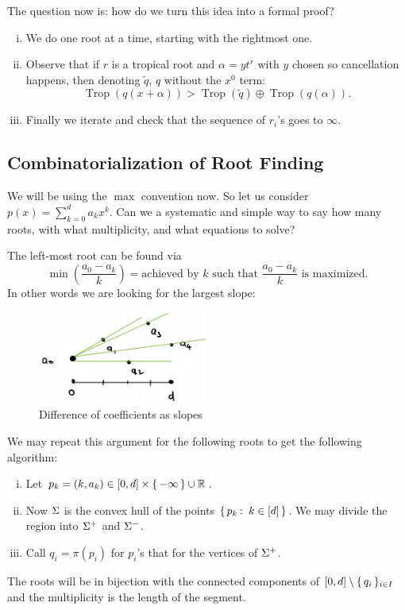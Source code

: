 \documentclass[12pt]{memoir}
\DeclareMathOperator{\Trop}{Trop}
\theoremstyle{definition}
\def\al{\alpha}
\begin{document}
The question now is: how do we turn this idea into a formal proof?
\begin{enumerate}[i.]
    \item We do one root at a time, starting with the rightmost one.
    \item Observe that if $r$ is a tropical root and $\al=yt^r$ with $y$ chosen so cancellation happens, then denoting $\tilde{q}$, $q$ without the $x^0$ term:
    $$\Trop(q(x+\al))>\Trop(\tilde{q})\oplus\Trop(q(\al)).$$
    \item Finally we iterate and check that the sequence of $r_i$'s goes to $\infty$.
\end{enumerate}

\subsection{Combinatorialization of Root Finding}

We will be using the $\max$ convention now. So let us consider $p(x)=\sum_{k=0}^da_kx^k$. Can we a systematic and simple way to say how many roots, with what multiplicity, and what equations to solve?\par 
The left-most root can be found via
$$\min\left(\frac{a_0-a_k}{k}\right)=\text{achieved by }k\text{ such that }\frac{a_0-a_k}{k}\text{ is maximized}.$$
In other words we are looking for the largest slope:
\begin{figure}[h!]
    \centering
    \includegraphics[width=0.5\textwidth]{figs/fig6-1BiggestSlope.png}
    \caption{Difference of coefficients as slopes}
    \label{fig:6.1-BiggestSlope}
\end{figure}
We may repeat this argument for the following roots to get the following algorithm:
\begin{enumerate}[i.]
    \item Let $p_k=(k,a_k)\in\left\lbrack0,d\right\rbrack\times\{\,-\infty\,\}\cup\mathbb{R}$.
    \item Now $\Sigma$ is the convex hull of the points $\{\,p_k\mathbin{:}\ k\in[d]\,\}$. We may divide the region into $\Sigma^+$ and $\Sigma^-$.
    \item Call $q_i=\pi(p_i)$ for $p_i$'s that for the vertices of $\Sigma^+$.
\end{enumerate}
The roots will be in bijection with the connected components of $\left\lbrack0,d\right\rbrack\setminus\{\,q_i\,\}_{i\in I}$ and the multiplicity is the length of the segment.
\end{document}
